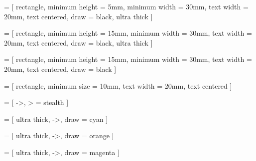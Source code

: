  = [
rectangle,
minimum height = 5mm,
minimum width = 30mm,
text width = 20mm,
text centered,
draw = black,
ultra thick
]

 = [
rectangle,
minimum height = 15mm,
minimum width = 30mm,
text width = 20mm,
text centered,
draw = black,
ultra thick
]

 = [
rectangle,
minimum height = 15mm,
minimum width = 30mm,
text width = 20mm,
text centered,
draw = black
]

 = [
rectangle,
minimum size = 10mm,
text width = 20mm,
text centered
]

 = [
->,
> = stealth
]

 = [
ultra thick,
->,
draw = cyan
]

 = [
ultra thick,
->,
draw = orange
]

 = [
ultra thick,
->,
draw = magenta
]

\newcommand{\synthmodule}[3]{
    \node(module)[block]{};
    \node(modulename)[nameblock, above of = module]{#2};
    \node(input)[emptyblock, left of = module, xshift = -3cm]{#1};
    \node(output)[emptyblock, right of = module, xshift = 3cm]{#3};
}
